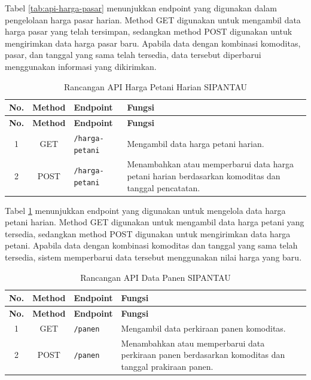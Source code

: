 Tabel \ref{tab:api-harga-pasar} menunjukkan endpoint yang digunakan dalam pengelolaan harga pasar harian. Method GET digunakan untuk mengambil data harga pasar yang telah tersimpan, sedangkan method POST digunakan untuk mengirimkan data harga pasar baru. Apabila data dengan kombinasi komoditas, pasar, dan tanggal yang sama telah tersedia, data tersebut diperbarui menggunakan informasi yang dikirimkan.

\begin{longtable}{|c|c|p{3.2cm}|p{6cm}|}
\caption{Rancangan API Harga Petani Harian SIPANTAU}
\label{tab:api-harga-petani} \\

\hline
\textbf{No.} & \textbf{Method} & \textbf{Endpoint} & \textbf{Fungsi} \\
\hline
\endfirsthead

\hline
\textbf{No.} & \textbf{Method} & \textbf{Endpoint} & \textbf{Fungsi} \\
\hline
\endhead

1 & GET & \texttt{/harga-petani} &
Mengambil data harga petani harian. \\ \hline

2 & POST & \texttt{/harga-petani} &
Menambahkan atau memperbarui data harga petani harian berdasarkan komoditas dan tanggal pencatatan. \\ \hline

\end{longtable}

Tabel \ref{tab:api-harga-petani} menunjukkan endpoint yang digunakan untuk mengelola data harga petani harian. Method GET digunakan untuk mengambil data harga petani yang tersedia, sedangkan method POST digunakan untuk mengirimkan data harga petani. Apabila data dengan kombinasi komoditas dan tanggal yang sama telah tersedia, sistem memperbarui data tersebut menggunakan nilai harga yang baru.

\begin{longtable}{|c|c|p{3.2cm}|p{6cm}|}
\caption{Rancangan API Data Panen SIPANTAU}
\label{tab:api-panen} \\

\hline
\textbf{No.} & \textbf{Method} & \textbf{Endpoint} & \textbf{Fungsi} \\
\hline
\endfirsthead

\hline
\textbf{No.} & \textbf{Method} & \textbf{Endpoint} & \textbf{Fungsi} \\
\hline
\endhead

1 & GET & \texttt{/panen} &
Mengambil data perkiraan panen komoditas. \\ \hline

2 & POST & \texttt{/panen} &
Menambahkan atau memperbarui data perkiraan panen berdasarkan komoditas dan tanggal prakiraan panen. \\ \hline

\end{longtable}

